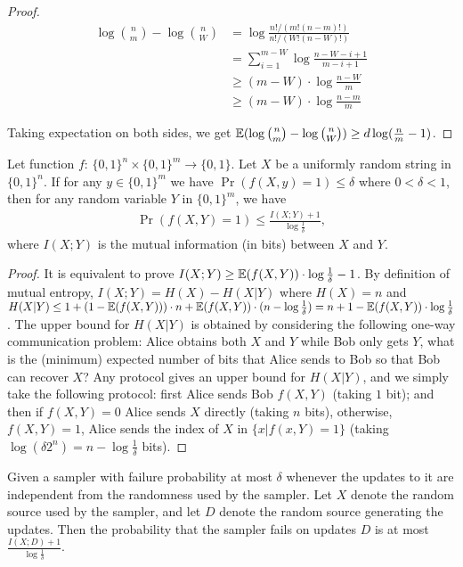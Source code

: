 \begin{proof}
  \begin{align}
  \log {n \choose m}-\log {n \choose W}
  &= \log \frac{n!/(m!(n-m)!)}{n!/(W!(n-W)!)} \\
  &= \sum_{i=1}^{m-W}\log \frac{n-W-i+1}{m-i+1} \\
  &\ge (m-W)\cdot \log \frac{n-W}{m} \\
  &\ge (m-W)\cdot \log \frac{n-m}{m}
  \end{align}
  
  Taking expectation on both sides, we get $\operatorname*{\mathbb{E}}(\log {n \choose m}-\log {n \choose W})\ge d \log (\frac{n}{m}-1)$. 
\end{proof}

\begin{lemma}\label{lemma:mutual-entropy-vs-fail-prob}
  Let function $f$: $\{0,1\}^n\times \{0,1\}^m\rightarrow \{0,1\}$. Let $X$ be a uniformly random string in $\{0,1\}^n$. If for any $y\in \{0,1\}^m$ we have $\Pr(f(X,y)=1)\le \delta$ where $0<\delta<1$, then for any random variable $Y$ in $\{0,1\}^m$, we have 
  \begin{align}
    \Pr(f(X,Y)=1)\le \frac{I(X;Y)+1}{\log \frac{1}{\delta}},
  \end{align}
  where $I(X;Y)$ is the mutual information (in bits) between $X$ and $Y$.
\end{lemma}

\begin{proof}
  It is equivalent to prove $I(X;Y)\ge \operatorname*{\mathbb{E}}(f(X,Y))\cdot \log\frac{1}{\delta}-1$. By definition of mutual entropy, $I(X;Y)=H(X)-H(X|Y)$ where $H(X)=n$ and $H(X|Y)\le 1+(1-\operatorname*{\mathbb{E}}(f(X,Y)))\cdot n+\operatorname*{\mathbb{E}}(f(X,Y))\cdot (n-\log\frac{1}{\delta})=n+1-\operatorname*{\mathbb{E}}(f(X,Y))\cdot \log\frac{1}{\delta}$.
  The upper bound for $H(X|Y)$ is obtained by considering the following one-way communication problem: Alice obtains both $X$ and $Y$ while Bob only gets $Y$, what is the (minimum) expected number of bits that Alice sends to Bob so that Bob can recover $X$? 
  Any protocol gives an upper bound for $H(X|Y)$, and we simply take the following protocol: first Alice sends Bob $f(X,Y)$ (taking $1$ bit); and then if $f(X,Y)=0$ Alice sends $X$ directly (taking $n$ bits), otherwise, $f(X,Y)=1$, Alice sends the index of $X$ in $\{x|f(x,Y)=1\}$ (taking $\log (\delta 2^n)=n-\log\frac{1}{\delta}$ bits).  
\end{proof}

\begin{corollary}\label{corollary:sampler-failure}
  Given a sampler with failure probability at most $\delta$ whenever the updates to it are independent from the randomness used by the sampler. Let $X$ denote the random source used by the sampler, and let $D$ denote the random source generating the updates. Then the probability that the sampler fails on updates $D$ is at most $\frac{I(X;D)+1}{\log\frac{1}{\delta}}$.
\end{corollary}

